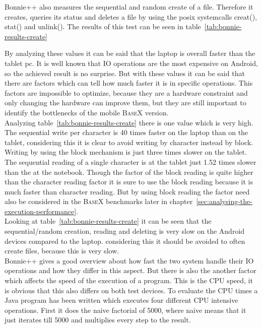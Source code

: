 
Bonnie++ also measures the sequential and random create of a file.
Therefore it creates, queries its status and deletes a file by using the posix systemcalls creat(), stat() and unlink().
The results of this test can be seen in table~\ref{tab:bonnie-results-create}

By analyzing these values it can be said that the laptop is overall faster than the tablet pc.
It is well known that IO operations are the most expensive on Android, so the achieved result is no surprise. 
But with these values it can be said that there are factors which can tell how much faster it is in specific operations.
This factors are impossible to optimize, because they are a hardware constraint and only changing the hardware can improve them, but they are still important to identify the bottlenecks of the mobile \textsc{BaseX} version.\\
Analyzing table~\ref{tab:bonnie-results-create} there is one value which is very high.
The sequential write per character is 40 times faster on the laptop than on the tablet, considering this it is clear to avoid writing by character instead by block.
Writing by using the block mechanism is just three times slower on the tablet.
The sequential reading of a single character is at the tablet just 1.52 times slower than the at the notebook.
Though the factor of the block reading is quite higher than the character reading factor it is sure to use the block reading because it is much faster than character reading.
But by using block reading the factor need also be considered in the \textsc{BaseX} benchmarks later in chapter~\ref{sec:analysing-the-execution-performance}.
\\
Looking at table~\ref{tab:bonnie-results-create} it can be seen that the sequential/random creation, reading and deleting is very slow on the Android devices compared to the laptop.
considering this it should be avoided to often create files, because this is very slow.\\
Bonnie++ gives a good overview about how fast the two system handle their IO operations and how they differ in this aspect.
But there is also the another factor which affects the speed of the execution of a program.
This is the CPU speed, it is obvious that this also differs on both test devices.
To evaluate the CPU times a Java program has been written which executes four different CPU intensive operations.
First it does the naive factorial of 5000, where naive means that it just iterates till 5000 and multiplies every step to the result.
